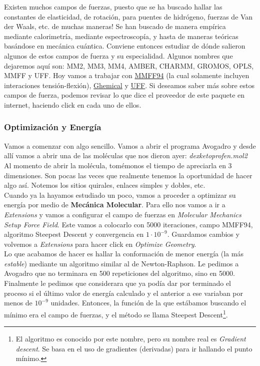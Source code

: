 \documentclass[10pt,letterpaper]{article}
\begin{document}
Existen muchos campos de fuerzas, puesto que se ha buscado hallar las constantes de elasticidad, de rotaci\'on, para puentes de hidr\'ogeno, fuerzas de Van der Waals, etc. de muchas maneras! Se han buscado de manera emp\'irica mediante calorimetr\'ia, mediante espectroscop\'ia, y hasta de maneras te\'oricas bas\'andose en mec\'anica cu\'antica. Conviene entonces estudiar de d\'onde salieron algunos de estos campos de fuerza y su especialidad. Algunos nombres que dejaremos aqu\'i son: MM2, MM3, MM4, AMBER, CHARMM, GROMOS, OPLS, MMFF y UFF. Hoy vamos a trabajar con \href{http://open-babel.readthedocs.org/en/latest/Forcefields/mmff94.html}{MMFF94} (la cual solamente incluyen interaciones tensi\'on-flexi\'on), \href{http://open-babel.readthedocs.org/en/latest/Forcefields/ghemical.html}{Ghemical} y \href{http://open-babel.readthedocs.org/en/latest/Forcefields/uff.html}{UFF}. Si deseamos saber m\'as sobre estos campos de fuerza, podemos revisar lo que dice el proveedor de este paquete en internet, haciendo click en cada uno de ellos.

\subsubsection{Optimizaci\'on y Energ\'ia}
Vamos a comenzar con algo sencillo. Vamos a abrir el programa Avogadro y desde all\'i vamos a abrir una de las mol\'eculas que nos dieron ayer: \textit{dexketoprofen.mol2} Al momento de abrir la mol\'ecula, tom\'emonos el tiempo de apreciarla en 3 dimensiones. Son pocas las veces que realmente tenemos la oportunidad de hacer algo as\'i. Notemos los sitios quirales, enlaces simples y dobles, etc.\\

Cuando ya la hayamos estudiado un poco, vamos a proceder a optimizar su energ\'ia por medio de \textbf{Mec\'anica Molecular}.  Para ello nos vamos a ir a \emph{Extensions} y vamos a configurar el campo de fuerzas en \emph{Molecular Mechanics} \emph{Setup Force Field}. Este vamos a colocarlo con 5000 iteraciones, campo MMFF94, algoritmo Steepest Descent y convergencia en $1 \cdot 10^{-9}$. Guardamos cambios y volvemos a \emph{Extensions} para hacer click en \emph{Optimize Geometry}.\\

Lo que acabamos de hacer es hallar la conformaci\'on de menor energ\'ia (la m\'as \emph{estable}) mediante un algoritmo similar al de Newton-Raphson. Le pedimos a Avogadro que no terminara en 500 repeticiones del algoritmo, sino en 5000. Finalmente le pedimos que considerara que ya pod\'ia dar por terminado el proceso si el \'ultimo valor de energ\'ia calculado y el anterior a ese variaban por menos de $10^{-9}$ unidades. Entonces, la funci\'on de la que est\'abamos buscando el m\'inimo era el campo de fuerzas, y el m\'etodo se llama Steepest Descent\footnote{El algoritmo es conocido por este nombre, pero su nombre real es \emph{Gradient descent}. Se basa en el uso de gradientes (derivadas) para ir hallando el punto m\'inimo.}.\\
\end{document}
